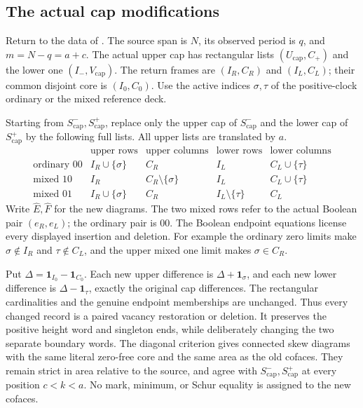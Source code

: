 \documentclass[11pt,a4paper]{amsart}
\numberwithin{equation}{section}
\theoremstyle{plain}
\theoremstyle{definition}
\newcommand{\one}{\mathbf1}
\newcommand{\sminus}{S^{-}_{\mathrm{cap}}}
\newcommand{\splus}{S^{+}_{\mathrm{cap}}}
\begin{document}
\subsection{The actual cap modifications}

Return to the data of .  The
source span is \(N\), its observed period is \(q\), and \(m=N-q=a+c\).
The actual upper cap has rectangular lists \((U_{\mathrm{cap}},C_+)\) and the lower one
\((I_-,V_{\mathrm{cap}})\).  The return frames are \((I_R,C_R)\) and \((I_L,C_L)\); their
common disjoint core is \((I_0,C_0)\).  Use the active indices \(\sigma,\tau\)
of the positive-clock ordinary or the mixed reference deck.

Starting from \(\sminus,\splus\), replace only the upper cap of \(\sminus\)
and the lower cap of \(\splus\) by the following full lists.  All upper
lists are translated by \(a\).
\begin{equation}\label{eq:modified-cap-table}
\begin{array}{c|cc|cc}
 &\text{upper rows}&\text{upper columns}
 &\text{lower rows}&\text{lower columns}\\ \hline
 \text{ordinary }00&I_R\cup\{\sigma\}&C_R&I_L&C_L\cup\{\tau\}\\
 \text{mixed }10&I_R&C_R\setminus\{\sigma\}&I_L&C_L\cup\{\tau\}\\
 \text{mixed }01&I_R\cup\{\sigma\}&C_R&I_L\setminus\{\tau\}&C_L
\end{array}
\end{equation}
Write \(\widehat E,\widehat F\) for the new diagrams.  The two mixed rows
refer to the actual Boolean pair \((e_R,e_L)\); the ordinary pair is \(00\).
The Boolean endpoint equations license every displayed insertion and
deletion.  For example the ordinary zero limits make \(\sigma\notin I_R\)
and \(\tau\notin C_L\), and the upper mixed one limit makes
\(\sigma\in C_R\).

Put \(\Delta=\one_{I_0}-\one_{C_0}\).  Each new upper difference is
\(\Delta+\one_\sigma\), and each new lower difference is
\(\Delta-\one_\tau\), exactly the original cap differences.  The
rectangular cardinalities and the genuine endpoint memberships are
unchanged.  Thus every changed record is a paired vacancy restoration or
deletion.  It preserves the positive height word and singleton ends,
while deliberately changing the two separate boundary words.  The
diagonal criterion gives connected skew diagrams with the same literal
zero-free core and the same area as the old cofaces.  They remain strict
in area relative to the source, and agree with \(\sminus,\splus\) at every
position \(c<k<a\).  No mark, minimum, or Schur equality is assigned to the
new cofaces.
\end{document}
